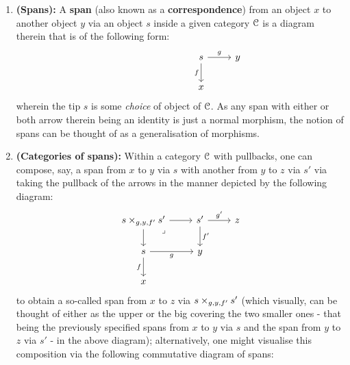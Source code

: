                 \begin{definition}[Spans] \label{def: spans}
                    \noindent
                    \begin{enumerate}
                        \item \textbf{(Spans):} A \textbf{span} (also known as a \textbf{correspondence}) from an object $x$ to another object $y$ via an object $s$ inside a given category $\mathcal{C}$ is a diagram therein that is of the following form:
                            $$
                                \begin{tikzcd}
                                	&&& s & y \\
                                	{} &&& x
                                	\arrow["f"', from=1-4, to=2-4]
                                	\arrow["g", from=1-4, to=1-5]
                                \end{tikzcd}
                            $$
                        wherein the tip $s$ is some \textit{choice} of object of $\mathcal{C}$. As any span with either or both arrow therein being an identity is just a normal morphism, the notion of spans can be thought of as a generalisation of morphisms.  
                        \item \textbf{(Categories of spans):} Within a category $\mathcal{C}$ with pullbacks, one can compose, say, a span from $x$ to $y$ via $s$ with another from $y$ to $z$ via $s'$ via taking the pullback of the  arrows in the manner depicted by the following diagram:
                            $$
                                \begin{tikzcd}
                                	{s \x_{g, y, f'} s'} & {s'} & z \\
                                	s & y \\
                                	x
                                	\arrow["f"', from=2-1, to=3-1]
                                	\arrow["g"', from=2-1, to=2-2]
                                	\arrow["{f'}", from=1-2, to=2-2]
                                	\arrow["{g'}", from=1-2, to=1-3]
                                	\arrow[from=1-1, to=2-1]
                                	\arrow[from=1-1, to=1-2]
                                	\arrow["\lrcorner"{anchor=center, pos=0.125}, draw=none, from=1-1, to=2-2]
                                \end{tikzcd}
                            $$
                        to obtain a so-called  span from $x$ to $z$ via $s \x_{g, y, f'} s'$ (which visually, can be thought of either as the upper  or the big  covering the two smaller ones - that being the previously specified spans from $x$ to $y$ via $s$ and the span from $y$ to $z$ via $s'$ - in the above diagram); alternatively, one might visualise this composition via the following commutative diagram of spans:

\end{enumerate}
\end{definition}
